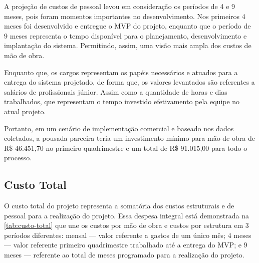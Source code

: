 \documentclass[
	12pt,				%
	openany,			%
	oneside,			%
	a4paper,			%
	english,			%
	french,				%
	spanish,			%
	brazil				%
	]{abntex2}
\begin{document}
A projeção de custos de pessoal levou em consideração os períodos de 4 e 9 meses, pois foram momentos importantes no desenvolvimento. Nos primeiros 4 meses foi desenvolvido e entregue o MVP do projeto, enquanto que o período de 9 meses representa o tempo disponível para o planejamento, desenvolvimento e implantação do sistema. Permitindo, assim, uma visão mais ampla dos custos de mão de obra.

Enquanto que,  os cargos representam os papéis necessários e atuados para a entrega do sistema projetado, de forma que, os valores levantados são referentes a salários de profissionais júnior. Assim como a quantidade de horas e dias trabalhados, que representam o tempo investido efetivamento pela equipe no atual projeto.

Portanto, em um cenário de implementação comercial e baseado nos dados coletados, a pousada parceira teria um investimento mínimo para mão de obra de R\$ 46.451,70 no primeiro quadrimestre e um total de R\$ 91.015,00 para todo o processo.
%
\subsection{Custo Total}
O custo total do projeto representa a somatória dos custos estruturais e de pessoal para a realização do projeto. Essa despesa integral está demonstrada na  \autoref{tab:custo-total} que une os custos por mão de obra e custos por estrutura em 3 períodos diferentes: mensal — valor referente a gastos de um único mês; 4 meses — valor referente primeiro quadrimestre trabalhado até a entrega do MVP; e 9 meses — referente ao total de meses programado para a realização do projeto.

\begin{table}[h!]
	\centering
	\caption{Custo Total por Categoria}
	\label{tab:custo-total}
\end{table}
\end{document}
